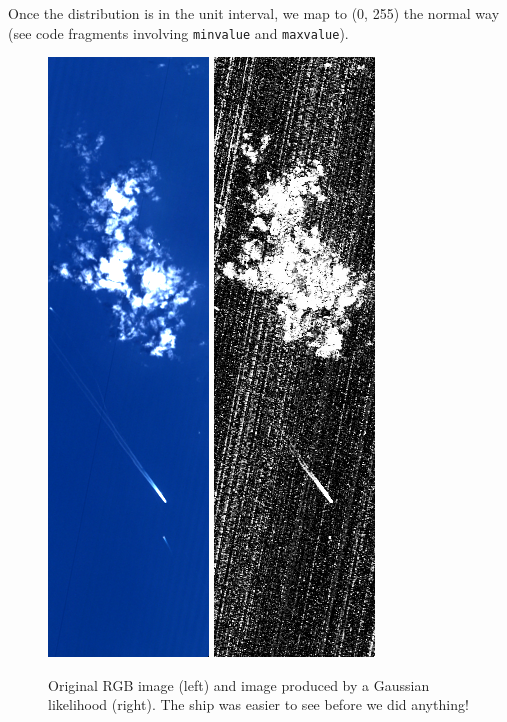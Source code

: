 \documentclass[12pt]{article}
\begin{document}
Once the distribution is in the unit interval, we map to (0, 255) the
normal way (see code fragments involving {\tt minvalue} and {\tt maxvalue}).

\begin{figure}[p]
\begin{center}
\includegraphics[width=0.28\linewidth]{high_contrast_fragment.png}
\includegraphics[width=0.28\linewidth]{likelihood_image.png}
\end{center}
\caption{Original RGB image (left) and image produced by a Gaussian
  likelihood (right).  The ship was easier to see before we did
  anything! \label{likelihood_image}}
\end{figure}
\end{document}
